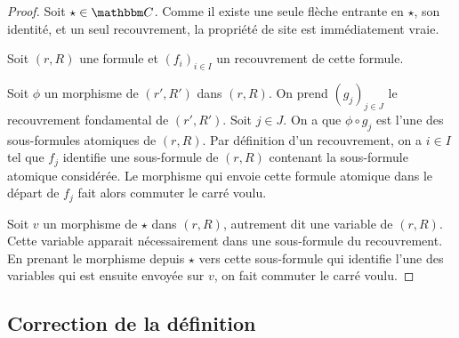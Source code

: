 \begin{proof}
    Soit $\star\in\C$. Comme il existe une seule flèche entrante en $\star$, son identité,
    et un seul recouvrement, la propriété de site est immédiatement vraie.

    Soit $(r,R)$ une formule et $(f_i)_{i\in I}$ un recouvrement de cette formule.
    
    Soit $\phi$ un morphisme de $(r', R')$ dans $(r,R)$. On prend $(g_j)_{j\in J}$ le
    recouvrement fondamental de $(r', R')$. Soit $j\in J$. On a que $\phi\circ g_j$ est
    l'une des sous-formules atomiques de $(r,R)$. Par définition d'un recouvrement, on
    a $i\in I$ tel que $f_j$ identifie une sous-formule de $(r,R)$ contenant la
    sous-formule atomique considérée. Le morphisme qui envoie cette formule atomique
    dans le départ de $f_j$ fait alors commuter le carré voulu.

    Soit $v$ un morphisme de $\star$ dans $(r,R)$, autrement dit une variable de $(r,R)$.
    Cette variable apparait nécessairement dans une sous-formule du recouvrement. En
    prenant le morphisme depuis $\star$ vers cette sous-formule qui identifie l'une des
    variables qui est ensuite envoyée sur $v$, on fait commuter le carré voulu.
\end{proof}

\subsection{Correction de la définition}



